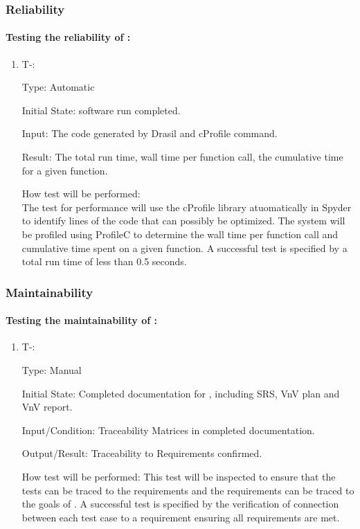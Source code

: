 \documentclass[12pt, titlepage]{article}
\newcounter{tinnum} %
\begin{document}
\subsubsection{Reliability} \label{nonfunc_reliability}
\paragraph{Testing the reliability of \progname{}:}

\begin{enumerate}

\item{T-}\thetinnum\label{T-10}:

Type: Automatic
					
Initial State: \progname{} software run completed.
					
Input: The code generated by Drasil and cProfile command.

Result: The total run time, wall time per function call, the cumulative time for a given function.
			
					
How test will be performed: \\
The test for performance will use the cProfile library 
atuomatically in Spyder to identify lines of the code that can possibly be 
optimized. The system will be profiled using ProfileC to determine the wall time 
per function call and cumulative time spent on a given function. A successful test is specified by a total run time of less than 0.5 seconds. \\
\end{enumerate}

\subsubsection{Maintainability} \label{nonfunc_maintainability}
\paragraph{Testing the maintainability of \progname{}:}

\begin{enumerate}

\item{T-}\thetinnum\label{T-11}:

Type: Manual
					
Initial State: Completed documentation for \progname{}, including SRS, VnV plan 
and VnV report.
					
Input/Condition: Traceability Matrices in completed documentation.
					
Output/Result: Traceability to Requirements confirmed. 
					
How test will be performed: This test will be inspected to ensure that the tests 
can be traced to the requirements and the requirements can be traced to the 
goals of \progname{}. A successful test is specified by the verification of connection between each test case to a requirement ensuring all requirements are met.
					

\end{enumerate}
\end{document}
